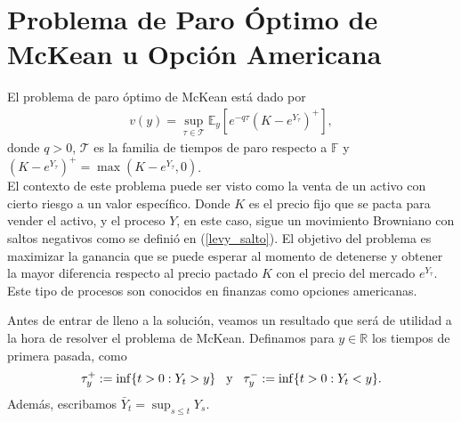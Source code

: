 \section[Problema de McKean u Opción Americana]{Problema de Paro Óptimo de McKean u Opción Americana}
El problema de paro óptimo de McKean está dado por
\begin{align}
	v(y) = \sup_{\tau \in \mathcal{T}} \mathbb{E}_y \left[ e^{-q \tau} (K - e^{Y_{\tau}})^{+} \right], \label{mckean}
\end{align}
donde $q > 0$, $\mathcal{T}$ es la familia de tiempos de paro respecto a $\mathbb{F}$ y $(K - e^{Y_{\tau}})^{+} = \max(K - e^{Y_{\tau}}, 0)$. \\

El contexto de este problema puede ser visto como la venta de un activo con cierto riesgo a un valor específico. Donde $K$ es el precio fijo que se pacta para vender el activo, y el proceso $Y$, en este caso, sigue un movimiento Browniano con saltos negativos como se definió en (\ref{levy_salto}). El objetivo del problema es maximizar la ganancia que se puede esperar al momento de detenerse y obtener la mayor diferencia respecto al precio pactado $K$ con el precio del mercado $e^{Y_{\tau}}$. Este tipo de procesos son conocidos en finanzas como opciones americanas.  

Antes de entrar de lleno a la solución, veamos un resultado que será de utilidad a la hora de resolver el problema de McKean. Definamos para $y \in \mathbb{R}$ los tiempos de primera pasada, como
\begin{align*}
	\tau_{y}^{+} := \inf \{ t > 0 : Y_t > y \} \hspace{0.3cm} \text{y} \hspace{0.3cm} \tau_{y}^{-} := \inf \{ t > 0 : Y_t < y \}.
\end{align*}
Además, escribamos $\bar{Y}_t = \sup_{s \leq t} Y_s$.

